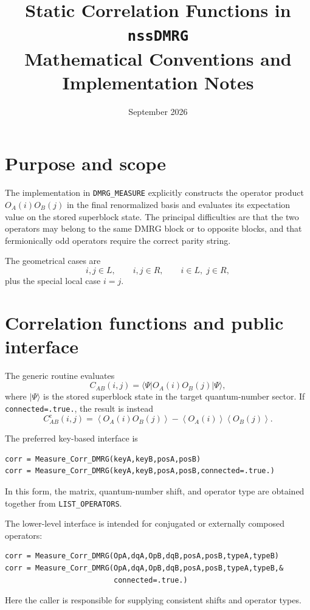 \documentclass[11pt,a4paper]{article}
\title{Static Correlation Functions in \texttt{nssDMRG}\\
       \large Mathematical Conventions and Implementation Notes}
\author{}
\date{September 2026}
\newcommand{\ket}[1]{\lvert #1\rangle}
\newcommand{\bra}[1]{\langle #1\rvert}
\newcommand{\avg}[1]{\left\langle #1\right\rangle}
\begin{document}
\maketitle
\tableofcontents

\section{Purpose and scope}

The implementation in \texttt{DMRG\_MEASURE} explicitly constructs the
operator product $O_A(i)O_B(j)$ in the final renormalized basis and evaluates
its expectation value on the stored superblock state.  The principal
difficulties are that the two operators may belong to the same DMRG block or
to opposite blocks, and that fermionically odd operators require the correct
parity string.

The geometrical cases are
\begin{equation}
  i,j\in L, \qquad i,j\in R, \qquad i\in L,\;j\in R,
\end{equation}
plus the special local case $i=j$.

\section{Correlation functions and public interface}

The generic routine evaluates
\begin{equation}
  C_{AB}(i,j)
  =\bra{\Psi}O_A(i)O_B(j)\ket{\Psi},
\end{equation}
where $\ket{\Psi}$ is the stored superblock state in the target quantum-number
sector.  If \texttt{connected=.true.}, the result is instead
\begin{equation}
  C^{\mathrm c}_{AB}(i,j)
  =\avg{O_A(i)O_B(j)}
   -\avg{O_A(i)}\avg{O_B(j)}.
\end{equation}

The preferred key-based interface is
\begin{lstlisting}[style=fortran]
corr = Measure_Corr_DMRG(keyA,keyB,posA,posB)
corr = Measure_Corr_DMRG(keyA,keyB,posA,posB,connected=.true.)
\end{lstlisting}
In this form, the matrix, quantum-number shift, and operator type are obtained
together from \texttt{LIST\_OPERATORS}.

The lower-level interface is intended for conjugated or externally composed
operators:
\begin{lstlisting}[style=fortran]
corr = Measure_Corr_DMRG(OpA,dqA,OpB,dqB,posA,posB,typeA,typeB)
corr = Measure_Corr_DMRG(OpA,dqA,OpB,dqB,posA,posB,typeA,typeB,&
                         connected=.true.)
\end{lstlisting}
Here the caller is responsible for supplying consistent shifts and operator
types.
\end{document}

